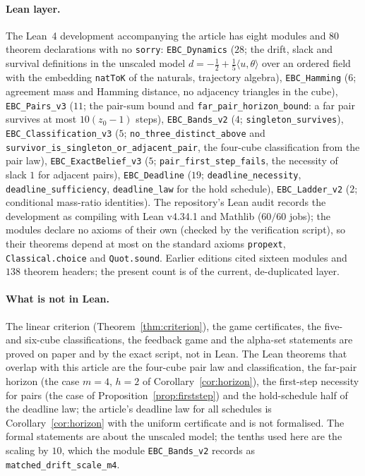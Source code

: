 \documentclass[11pt,a4paper]{article}
\theoremstyle{plain}
\theoremstyle{definition}
\theoremstyle{remark}
\newcommand{\tfr}[2]{\tfrac{#1}{#2}}
\begin{document}
\paragraph{Lean layer.}
The Lean~4 \cite{MouraUllrich2021} development accompanying the article has eight modules and $80$ theorem declarations with no \texttt{sorry}: \texttt{EBC\_Dynamics} ($28$; the drift, slack and survival definitions in the unscaled model $d=-\tfr12+\tfr15\langle u,\theta\rangle$ over an ordered field with the embedding \texttt{natToK} of the naturals, trajectory algebra), \texttt{EBC\_Hamming} ($6$; agreement mass and Hamming distance, no adjacency triangles in the cube), \texttt{EBC\_Pairs\_v3} ($11$; the pair-sum bound and \texttt{far\_pair\_horizon\_bound}: a far pair survives at most $10(z_0-1)$ steps), \texttt{EBC\_Bands\_v2} ($4$; \texttt{singleton\_survives}), \texttt{EBC\_Classification\_v3} ($5$; \texttt{no\_three\_distinct\_above} and \texttt{survivor\_is\_singleton\_or\_adjacent\_pair}, the four-cube classification from the pair law), \texttt{EBC\_ExactBelief\_v3} ($5$; \texttt{pair\_first\_step\_fails}, the necessity of slack $1$ for adjacent pairs), \texttt{EBC\_Deadline} ($19$; \texttt{deadline\_necessity}, \texttt{deadline\_sufficiency}, \texttt{deadline\_law} for the hold schedule), \texttt{EBC\_Ladder\_v2} ($2$; conditional mass-ratio identities). The repository's Lean audit records the development as compiling with Lean v4.34.1 and Mathlib ($60/60$ jobs); the modules declare no axioms of their own (checked by the verification script), so their theorems depend at most on the standard axioms \texttt{propext}, \texttt{Classical.choice} and \texttt{Quot.sound}. Earlier editions cited sixteen modules and $138$ theorem headers; the present count is of the current, de-duplicated layer.

\paragraph{What is not in Lean.}
The linear criterion (Theorem~\ref{thm:criterion}), the game certificates, the five- and six-cube classifications, the feedback game and the alpha-set statements are proved on paper and by the exact script, not in Lean. The Lean theorems that overlap with this article are the four-cube pair law and classification, the far-pair horizon (the case $m=4$, $h=2$ of Corollary~\ref{cor:horizon}), the first-step necessity for pairs (the case of Proposition~\ref{prop:firststep}) and the hold-schedule half of the deadline law; the article's deadline law for all schedules is Corollary~\ref{cor:horizon} with the uniform certificate and is not formalised. The formal statements are about the unscaled model; the tenths used here are the scaling by $10$, which the module \texttt{EBC\_Bands\_v2} records as \texttt{matched\_drift\_scale\_m4}.
\end{document}
